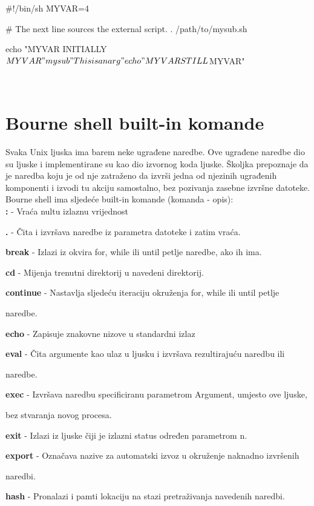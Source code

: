 \documentclass[11pt]{book}
\begin{document}
\begin{shortlisting}
#!/bin/sh
MYVAR=4
 
# The next line sources the external script.
. /path/to/mysub.sh
 
echo "MYVAR INITIALLY $MYVAR"
mysub "This is an arg"
echo "MYVAR STILL $MYVAR"
\end{shortlisting}\\

\section{Bourne shell built-in komande}
Svaka Unix ljuska ima barem neke ugrađene naredbe. Ove ugrađene naredbe dio su ljuske i implementirane su kao dio izvornog koda ljuske. Školjka prepoznaje da je naredba koju je od nje zatraženo da izvrši jedna od njezinih ugrađenih komponenti i izvodi tu akciju samostalno, bez pozivanja zasebne izvršne datoteke.\\

Bourne shell ima sljedeće  built-in komande (komanda - opis):\\

\textbf{:} - Vraća nultu izlaznu vrijednost

\textbf{.} - Čita i izvršava naredbe iz parametra datoteke i zatim vraća.

\textbf{break} - Izlazi iz okvira for, while ili until petlje naredbe, ako ih ima.

\textbf{cd} - Mijenja trenutni direktorij u navedeni direktorij.

\textbf{continue} - Nastavlja sljedeću iteraciju okruženja for, while ili until petlje

naredbe.

\textbf{echo} - Zapisuje znakovne nizove u standardni izlaz

\textbf{eval} - Čita argumente kao ulaz u ljusku i izvršava rezultirajuću naredbu ili

naredbe.

\textbf{exec} - Izvršava naredbu specificiranu parametrom Argument, umjesto ove ljuske,

bez stvaranja novog procesa.

\textbf{exit} - Izlazi iz ljuske čiji je izlazni status određen parametrom n.

\textbf{export} - Označava nazive za automatski izvoz u okruženje naknadno izvršenih

naredbi.

\textbf{hash} - Pronalazi i pamti lokaciju na stazi pretraživanja navedenih naredbi.
\end{document}
